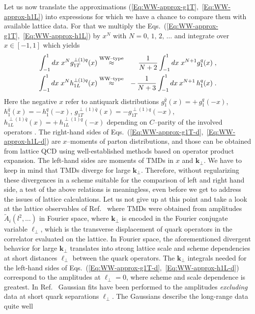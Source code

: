 \documentclass[a4paper,11pt]{article}
\newcommand{\ba}{\begin{eqnarray}}
\newcommand{\ea}{\end{eqnarray}}
\newcommand{\WWtype}{\ensuremath{\stackrel{\text{\scriptsize WW--type}}{\approx}}}
\def\bflperp{{\bm \ell}_\perp}
\def\bfkperp{{\bm k}_\perp}
\begin{document}
Let us now translate the approximations
(\ref{Eq:WW-approx-g1T},~\ref{Eq:WW-approx-h1L}) into expressions
for which we have a chance to compare them with available lattice data.
For that we multiply the
Eqs.~(\ref{Eq:WW-approx-g1T},~\ref{Eq:WW-approx-h1L}) by $x^N$
with $N=0,\,1,\,2,\,\dots$ and integrate over $x\in[-1,1]$ which yields
\ba
        \int_{-1}^1 d x\;x^N
       g_{1T}^{\perp(1)q}(x)&\WWtype&
        \phantom{-} \,\frac{1}{N+2} \int_{-1}^1 d x \;x^{N+1}g_1^q(x)
        \;,
    \label{Eq:WW-approx-g1T-d}\\
        \int_{-1}^1 d x\;x^N
        h_{1L}^{\perp(1)q}(x)&\WWtype&
        -\,\frac{1}{N+3} \int_{-1}^1 d x\: x^{N+1}\,h_1^q(x)
        \;.
    \label{Eq:WW-approx-h1L-d}
\ea
Here the 
negative $x$ refer to antiquark distributions
$g_1^{\bar q}(x) = +\,g_1^{q}(-x)$,
$h_1^{\bar q}(x) = -\,h_1^{q}(-x)$,
$g_{1T}^{\perp(1)\bar q}(x) =- g_{1T}^{\perp(1)q}(-x)$,
$h_{1L}^{\perp(1)\bar q}(x) = +\,h_{1L}^{\perp(1)q}(-x)$
depending on $C$--parity of the involved operators \cite{Mulders:1995dh}.
The right-hand sides of
Eqs.~(\ref{Eq:WW-approx-g1T-d},~\ref{Eq:WW-approx-h1L-d}) are $x$--moments
of parton distributions, and those can be obtained from lattice QCD using
well-established methods based on operator product expansion.
The left-hand sides are moments of TMDs in $x$ and $\bfkperp$. We have to
keep in mind that TMDs diverge for large $\bfkperp$. Therefore, without
regularizing these divergences in a scheme suitable for the comparison of
left and right hand side, a test of the above relations is meaningless,
even before we get to address the issues of lattice calculations. Let us
not give up at this point and take a look at the lattice observables of
Ref.~\cite{Musch:2010ka} where TMDs were obtained from amplitudes
$\tilde A_i(l^2,\ldots)$ in Fourier space, where $\bfkperp$ is encoded
in the Fourier conjugate variable $\bflperp$, which is the transverse
displacement of quark operators in the correlator evaluated on the lattice.
In Fourier space, the aforementioned divergent behavior for large $\bfkperp$
translates into strong lattice scale and scheme dependencies at short distances
$\bflperp$ between the quark operators. The $\bfkperp$ integrals needed for
the left-hand sides of Eqs.~(\ref{Eq:WW-approx-g1T-d},~\ref{Eq:WW-approx-h1L-d})
correspond to the amplitudes at $\bflperp = 0$, where scheme and
scale dependence is greatest.  In Ref.~\cite{Musch:2010ka} Gaussian fits
have been performed to the amplitudes \emph{excluding} data at short quark
separations $\bflperp$. The Gaussians describe the long-range data quite well
\end{document}

